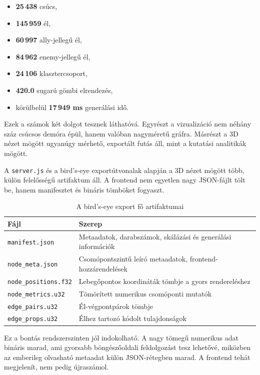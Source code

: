 \documentclass[a4paper,12pt]{report}
\begin{document}
\begin{itemize}
    \item \textbf{25\,438} csúcs,
    \item \textbf{145\,959} él,
    \item \textbf{60\,997} ally-jellegű él,
    \item \textbf{84\,962} enemy-jellegű él,
    \item \textbf{24\,106} klasztercsoport,
    \item \textbf{420.0} sugarú gömbi elrendezés,
    \item körülbelül \textbf{17\,949 ms} generálási idő.
\end{itemize}

Ezek a számok két dolgot tesznek láthatóvá. Egyrészt a vizualizáció nem néhány száz csúcsos demóra épül, hanem valóban nagyméretű gráfra. Másrészt a 3D nézet mögött ugyanúgy mérhető, exportált futás áll, mint a kutatási analitikák mögött.

A \texttt{server.js} és a bird's-eye exportútvonalak alapján a 3D nézet mögött több, külön felelősségű artifaktum áll. A frontend nem egyetlen nagy JSON-fájlt tölt be, hanem manifesztet és bináris tömböket fogyaszt.

\begin{table}[H]
\centering
\caption{A bird's-eye export fő artifaktumai}
\begin{tabularx}{\textwidth}{>{\raggedright\arraybackslash}p{4.2cm}X}
\toprule
\textbf{Fájl} & \textbf{Szerep} \\
\midrule
\texttt{manifest.json} & Metaadatok, darabszámok, skálázási és generálási információk \\
\texttt{node\_meta.json} & Csomópontszintű leíró metaadatok, frontend-hozzárendelések \\
\texttt{node\_positions.f32} & Lebegőpontos koordináták tömbje a gyors rendereléshez \\
\texttt{node\_metrics.u32} & Tömörített numerikus csomóponti mutatók \\
\texttt{edge\_pairs.u32} & Él-végpontpárok tömbje \\
\texttt{edge\_props.u32} & Élhez tartozó kódolt tulajdonságok \\
\bottomrule
\end{tabularx}
\end{table}

Ez a bontás rendszerszinten jól indokolható. A nagy tömegű numerikus adat bináris marad, ami gyorsabb böngészőoldali feldolgozást tesz lehetővé, miközben az emberileg olvasható metaadat külön JSON-rétegben marad. A frontend tehát megjelenít, nem pedig újraszámol.
\end{document}
